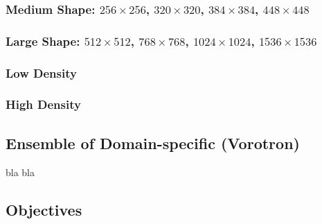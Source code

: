\documentclass[format=acmsmall,screen,review,authordraft,nonacm]{acmart}
\newcommand{\ourjfa}{Vorotron} %
\begin{document}
\subsubsection{Medium Shape: $256\times256$, $320\times320$, $384\times384$, $448\times448$}
\subsubsection{Large Shape: $512\times512$, $768\times768$, $1024\times1024$, $1536\times1536$}

\subsubsection{Low Density}
\subsubsection{High Density}


\subsection{Ensemble of Domain-specific (\ourjfa)} %

bla bla

\subsection{Objectives} %
\end{document}
